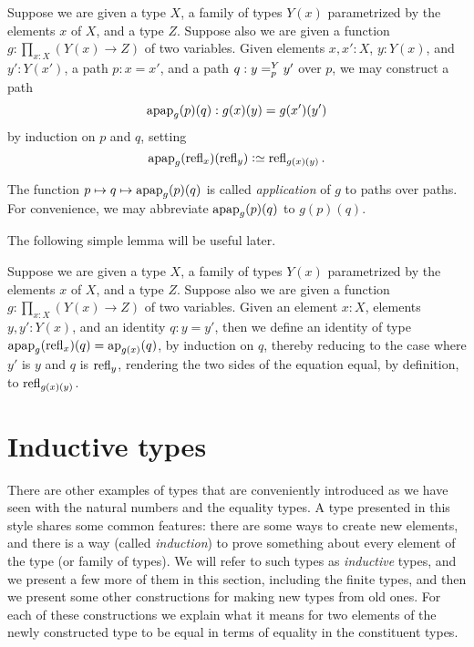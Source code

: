 \begin{definition}\label{def:applfun2}
  Suppose we are given a type $X$, a family of types $Y(x)$ parametrized by the elements $x$ of $X$, and a type $Z$.
  Suppose also we are given a function $g : \prod_{x:X} (Y(x) \to Z)$ of two variables.
  Given elements $x,x':X$, $y:Y(x)$, and
  $y':Y(x')$, a path $p : x = x'$, and a path $q :y =^{Y}_{p} y'$ over $p$,
  we may construct a path $$\apap g p q : g(x)(y) = g(x')(y')$$ by induction on $p$ and $q$,
  setting $$\apap g {\refl x}{\refl y} \defeq \refl {g(x)(y)}.$$
\end{definition}

The function $p \mapsto q \mapsto \apap g p q$ is called {\em application} of $g$ to paths over paths.
For convenience, we may abbreviate $\apap g p q$ to $g(p)(q)$.

The following simple lemma will be useful later.

\begin{definition}\label{def:applfun2comp}
  Suppose we are given a type $X$, a family of types $Y(x)$ parametrized by the elements $x$ of $X$, and a type $Z$.  Suppose also we are given
  a function $g : \prod_{x:X} (Y(x) \to Z)$ of two variables.  Given an element $x:X$, elements $y, y':Y(x)$, and an identity $q : y = y'$, then
  we define an identity of type $\apap g {\refl x} q = \ap {g(x)}(q)$, by induction on $q$, thereby reducing to the case where $y'$ is
  $y$ and $q$ is $\refl y$, rendering the two sides of the equation equal, by definition, to $\refl {g(x)(y)}$.
\end{definition}


\section{Inductive types}
\label{sec:inductive-types}

There are other examples of types that are conveniently introduced as we have seen with the natural numbers and the equality types.  A type
presented in this style shares some common features: there are some ways to create new elements, and there is a way (called {\em induction}) to
prove something about every element of the type (or family of types).  We will refer to such types as {\em inductive} types, and we present a
few more of them in this section, including the finite types, and then we present some other constructions for making new types from old ones.
For each of these constructions we explain what it means for two elements of the newly constructed type to be equal in terms of equality in the
constituent types.


